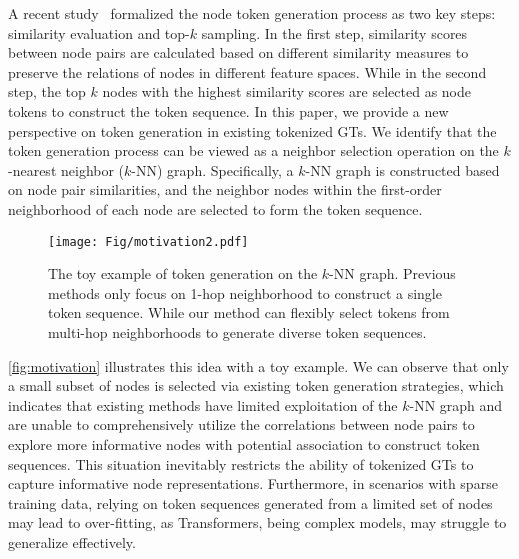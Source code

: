 A recent study~\cite{ntformer} formalized the node token generation process as two key steps: similarity evaluation and top-$k$ sampling. 
In the first step, similarity scores between node pairs are calculated based on different similarity measures to preserve the relations of nodes in different feature spaces. While in the second step, the top $k$ nodes with the highest similarity scores are selected as node tokens to construct the token sequence. 
In this paper, we provide a new perspective on token generation in existing tokenized GTs. 
We identify that the token generation process can be viewed as a neighbor selection operation on the $k$-nearest neighbor ($k$-NN) graph.  
Specifically, a $k$-NN graph is constructed based on node pair similarities, and the neighbor nodes within the first-order neighborhood of each node are selected to form  the token sequence.


\begin{figure}[h]
    \centering    
    \texttt{[image: Fig/motivation2.pdf]}
    \caption{The toy example of token generation on the $k$-NN graph. Previous methods only focus on 1-hop neighborhood to construct a single token sequence. While our method can flexibly select tokens from multi-hop neighborhoods to generate diverse token sequences.}
    \label{fig:motivation}
\end{figure}


\autoref{fig:motivation} illustrates this idea with a toy example.
We can observe that only a small subset of nodes is selected via existing token generation strategies, which indicates that existing methods have limited exploitation of the $k$-NN graph and are unable to comprehensively utilize the correlations between node pairs to explore more informative nodes with potential association to construct token sequences. 
This situation inevitably restricts the ability of tokenized GTs to capture informative node representations. 
Furthermore, in scenarios with sparse training data, relying on token sequences generated from a limited set of nodes may lead to over-fitting, as Transformers, being complex models, may struggle to generalize effectively.

